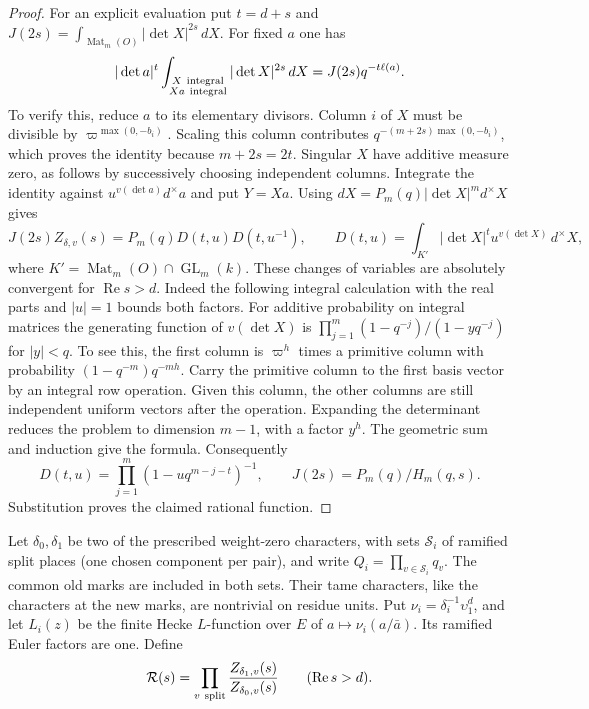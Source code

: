\documentclass[a4paper,11pt]{article}
\theoremstyle{definition}
\theoremstyle{remark}
\numberwithin{equation}{section}
\begin{document}
\begin{proof}
For an explicit evaluation put \(t=d+s\) and
\(J(2s)=\int_{\operatorname{Mat}_m(O)}|\det X|^{2s}\,dX\).
For fixed \(a\) one has
\[
 |\det a|^t
 \int_{\substack{X\ {\rm integral}\\ Xa\ {\rm integral}}}
                 |\det X|^{2s}\,dX
            =J(2s)q^{-t\ell(a)} .
\]
To verify this, reduce \(a\) to its elementary divisors.
Column \(i\) of \(X\) must be divisible by
\(\varpi^{\max(0,-b_i)}\). Scaling this column contributes
\(q^{-(m+2s)\max(0,-b_i)}\), which proves the identity
because \(m+2s=2t\). Singular \(X\) have additive measure
zero, as follows by successively choosing independent columns.
Integrate the identity against \(u^{v(\det a)}d^\times a\)
and put \(Y=Xa\). Using \(dX=P_m(q)|\det X|^m d^\times X\)
gives
\[
 J(2s) Z_{\delta,v}(s)=P_m(q) D(t,u)D(t,u^{-1}),\qquad
 D(t,u)=\int_{K'\!}|\det X|^t u^{v(\det X)}\,d^\times X ,
\]
where \(K'=\operatorname{Mat}_m(O)\cap\operatorname{GL}_m(k)\).
These changes of variables are absolutely convergent for
\(\operatorname{Re}s>d\). Indeed the following integral
calculation with the real parts and \(|u|=1\) bounds both
factors. For additive probability on integral matrices the
generating function of \(v(\det X)\) is
\(\prod_{j=1}^m(1-q^{-j})/(1-yq^{-j})\) for \(|y|<q\).
To see this, the first column is \(\varpi^h\) times a
primitive column with probability \((1-q^{-m})q^{-mh}\).
Carry the primitive column to the first basis vector by an
integral row operation. Given this column, the other columns
are still independent uniform vectors after the operation.
Expanding the determinant reduces the problem to dimension
\(m-1\), with a factor \(y^h\). The geometric sum and
induction give the formula. Consequently
\[
 D(t,u)=\prod_{j=1}^m(1-uq^{m-j-t})^{-1},\qquad
 J(2s)=P_m(q)/H_m(q,s).
\]
Substitution proves the claimed rational function.
\end{proof}

Let \(\delta_0,\delta_1\) be two of the prescribed
weight-zero characters, with sets \(\mathcal S_i\) of
ramified split places (one chosen component per pair),
and write \(Q_i=\prod_{v\in\mathcal S_i}q_v\).
The common old marks are included in both sets.
Their tame characters, like the characters at the new
marks, are nontrivial on residue units. Put
\(\nu_i=\delta_i^{-1}\upsilon_1^d\), and let \(L_i(z)\)
be the finite Hecke \(L\)-function over \(E\) of
\(a\mapsto\nu_i(a/\bar a)\). Its ramified Euler factors
are one. Define
\[
             \mathcal R(s)=\prod_{v\ {\rm split}}
                    \frac{Z_{\delta_1,v}(s)}{Z_{\delta_0,v}(s)}
                 \qquad(\operatorname{Re}s>d).
\]
\end{document}
